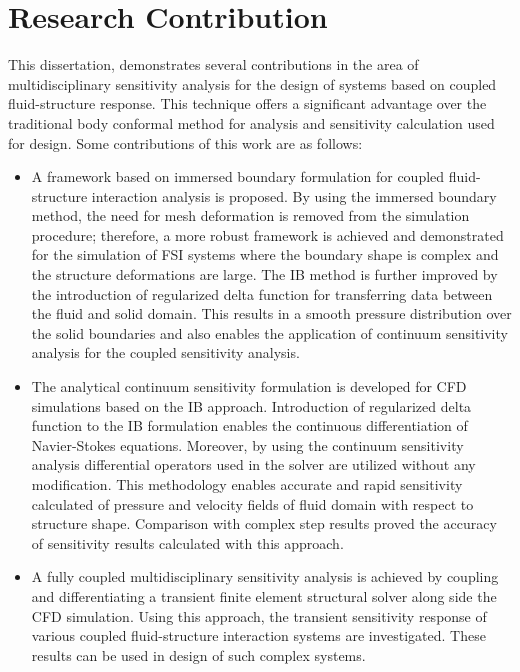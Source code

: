 \section{Research Contribution}
This dissertation, demonstrates several contributions in the area of multidisciplinary sensitivity analysis for the design of systems based on coupled fluid-structure response. This technique offers a significant advantage over the traditional body conformal method for analysis and sensitivity calculation used for design. Some contributions of this work are as follows:
\begin{itemize}
	\item A framework based on immersed boundary formulation for coupled fluid-structure interaction analysis is proposed. By using the immersed boundary method, the need for mesh deformation is removed from the simulation procedure; therefore, a more robust framework is achieved and demonstrated for the simulation of FSI systems where the boundary shape is complex and the structure deformations are large. The IB method is further improved by the introduction of regularized delta function for transferring data between the fluid and solid domain. This results in a smooth pressure distribution over the solid boundaries and also enables the application of continuum sensitivity analysis for the coupled sensitivity analysis.
	\item The analytical continuum sensitivity formulation is developed for CFD simulations based on the IB approach. Introduction of regularized delta function to the IB formulation enables the continuous differentiation of Navier-Stokes equations. Moreover, by using the continuum sensitivity analysis differential operators used in the solver are utilized without any modification. This methodology enables accurate and rapid sensitivity calculated of pressure and velocity fields of fluid domain with respect to structure shape. Comparison with complex step results proved the accuracy of sensitivity results calculated with this approach.
	\item A fully coupled multidisciplinary sensitivity analysis is achieved by coupling and differentiating a transient finite element structural solver along side the CFD simulation. Using this approach, the transient sensitivity response of various coupled fluid-structure interaction systems are investigated. These results can be used in design of such complex systems.
\end{itemize}

